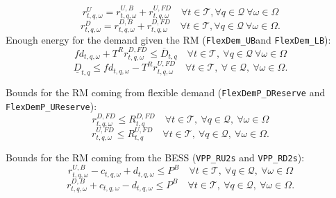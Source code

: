 \begin{equation} \label{EQ:RUcomp2}
    r^{U}_{t,q, \omega} = r^{U, B}_{t,q ,\omega} +  r^{U, FD}_{t,q, \omega} \quad \forall t \in \mathcal{T}, \forall q \in \mathcal{Q} \ \forall \omega \in \Omega
\end{equation}
\begin{equation} \label{EQ:RDcomp2}
	r^{D}_{t,q, \omega} = r^{D, B}_{t,q, \omega} +  r^{D, FD}_{t,q, \omega} \quad \forall t \in \mathcal{T}, \forall q \in \mathcal{Q} \ \forall \omega \in \Omega.
\end{equation}
Enough energy for the demand given the RM (\verb|FlexDem_UB|and \verb|FlexDem_LB|):
\begin{equation} \label{EQ:FlexDemand_UB2}
	fd_{t,q, \omega} + T^R r^{D, FD}_{t,q, \omega} \leq \overline{D}_{t,q} \quad \forall t \in \mathcal{T}, \ \forall q \in \mathcal{Q} \ \forall \omega \in \Omega
\end{equation}
\begin{equation} \label{EQ:FlexDemand_LB2}
	\underline{D}_{t,q} \leq fd_{t,q, \omega} - T^R r^{U, FD}_{t,q, \omega} \quad \forall t \in \mathcal{T}, \ \forall  \in \mathcal{Q}, \ \forall \omega \in \Omega.
\end{equation}

Bounds for the RM coming from flexible demand (\verb|FlexDemP_DReserve| and \verb|FlexDemP_UReserve|):
\begin{equation} \label{EQ:FlexDemP_DReserve2}
	r^{D, FD}_{t,q, \omega} \leq R^{D, FD}_{t,q} \quad \forall t \in \mathcal{T}, \ \forall q \in \mathcal{Q}, \ \forall \omega \in \Omega
\end{equation}
\begin{equation} \label{EQ:FlexDemP_UReserve2}
	r^{U, FD}_{t,q, \omega} \leq R^{U, FD}_{t,q} \quad \forall t \in \mathcal{T}, \ \forall q \in \mathcal{Q}, \ \forall \omega \in \Omega.
\end{equation}

Bounds for the RM coming from the BESS (\verb|VPP_RU2s| and \verb|VPP_RD2s|):
\begin{equation} \label{EQ:VPP_RU2s2}
	r^{U, B} _{t,q, \omega} - c_{t,q, \omega} + d_{t,q, \omega}  \leq P^B \quad \forall t \in \mathcal{T}, \ \forall q \in \mathcal{Q}, \ \forall \omega \in \Omega
\end{equation}
\begin{equation} \label{EQ:VPP_RD2s2}
	r^{D, B}_{t,q, \omega} + c_{t,q, \omega} - d_{t,q, \omega} \leq P^B \quad \forall t \in \mathcal{T}, \ \forall q \in \mathcal{Q}, \ \forall \omega \in \Omega.
\end{equation}

